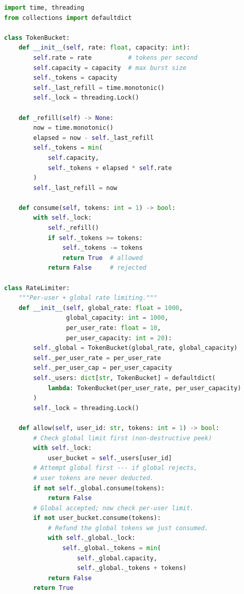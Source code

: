 \begin{lstlisting}[language=Python]
import time, threading
from collections import defaultdict

class TokenBucket:
    def __init__(self, rate: float, capacity: int):
        self.rate = rate          # tokens per second
        self.capacity = capacity  # max burst size
        self._tokens = capacity
        self._last_refill = time.monotonic()
        self._lock = threading.Lock()

    def _refill(self) -> None:
        now = time.monotonic()
        elapsed = now - self._last_refill
        self._tokens = min(
            self.capacity,
            self._tokens + elapsed * self.rate
        )
        self._last_refill = now

    def consume(self, tokens: int = 1) -> bool:
        with self._lock:
            self._refill()
            if self._tokens >= tokens:
                self._tokens -= tokens
                return True  # allowed
            return False     # rejected

class RateLimiter:
    """Per-user + global rate limiting."""
    def __init__(self, global_rate: float = 1000,
                 global_capacity: int = 1000,
                 per_user_rate: float = 10,
                 per_user_capacity: int = 20):
        self._global = TokenBucket(global_rate, global_capacity)
        self._per_user_rate = per_user_rate
        self._per_user_cap = per_user_capacity
        self._users: dict[str, TokenBucket] = defaultdict(
            lambda: TokenBucket(per_user_rate, per_user_capacity)
        )
        self._lock = threading.Lock()

    def allow(self, user_id: str, tokens: int = 1) -> bool:
        # Check global limit first (non-destructive peek)
        with self._lock:
            user_bucket = self._users[user_id]
        # Attempt global first --- if global rejects,
        # user tokens are never deducted.
        if not self._global.consume(tokens):
            return False
        # Global accepted; now check per-user limit.
        if not user_bucket.consume(tokens):
            # Refund the global tokens we just consumed.
            with self._global._lock:
                self._global._tokens = min(
                    self._global.capacity,
                    self._global._tokens + tokens)
            return False
        return True
\end{lstlisting}


